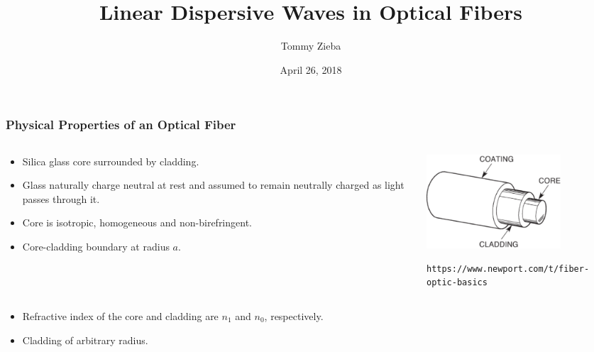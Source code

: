 \documentclass{beamer}
\title[Honours Project Presentation]{Linear Dispersive Waves in Optical Fibers} %
\author{Tommy Zieba} %
\institute[Carleton University] %
{
Carleton University \\ %
\medskip %
}
\date{April 26, 2018} %
\begin{document}
\begin{frame}
\titlepage %
\end{frame}
\begin{frame}[fragile]
\frametitle{\textbf{Physical Properties of an Optical Fiber}}
\begin{minipage}[1.0\textheight]{\textwidth}
\begin{columns}[T]
\begin{column}{0.55\textwidth}
\begin{itemize}
\item Silica glass core surrounded by cladding.
\item Glass naturally charge neutral at rest and assumed to remain neutrally charged as light passes through it.
\item Core is isotropic, homogeneous and non-birefringent.\\
\item Core-cladding boundary at radius $a$.
\end{itemize}
\end{column}
\begin{column}{0.45\textwidth}
\vspace{-5mm}\includegraphics[width=5cm]{fiberDiagram.eps}
\tiny{\begin{verbatim}
https://www.newport.com/t/fiber-optic-basics
\end{verbatim}}
\end{column}
\end{columns}
\end{minipage}

\begin{itemize}
\item Refractive index of the core and cladding are $n_1$ and $n_0$, respectively.
\item Cladding of arbitrary radius.
\end{itemize}
\end{frame}
\end{document}
